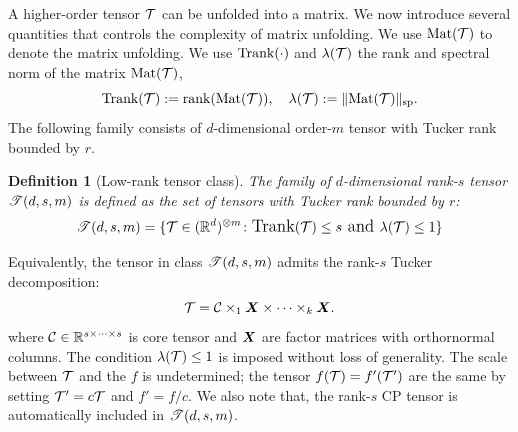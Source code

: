 \documentclass[final,12pt]{colt2020} %
\newtheorem{defn}{Definition}
\def\rank{\textup{Trank}}
\def\Mat{\textup{Mat}}
\def\caliT{\large\mathscr{T}}
\begin{document}

A higher-order tensor $\mathcal{T}$ can be unfolded into a matrix. We now introduce several quantities that controls the complexity of matrix unfolding. We use $\Mat(\tT)$ to denote the matrix unfolding. We use $\rank(\cdot)$ and $\lambda(\mathcal{T})$ the rank and spectral norm of the matrix $\Mat(\tT)$, 
\[
\rank(\tT):=\text{rank}(\Mat(\tT)), \quad  \lambda(\tT):=\snormSize{}{\Mat(\tT)}.
\]
The following family consists of $d$-dimensional order-$m$ tensor with Tucker rank bounded by $r$. 
\begin{defn}[Low-rank tensor class] The family of $d$-dimensional rank-$s$ tensor $\caliT(d,s,m)$ is defined as the set of tensors with Tucker rank bounded by $r$:
\[
\caliT(d,s,m)=\{\tT\in (\mathbb{R}^{d})^{\otimes m}\colon \rank(\tT)\leq s \text{ and } \lambda(\tT)\leq 1\}
\]
\end{defn}
Equivalently, the tensor in class $\caliT(d,s,m)$ admits the rank-$s$ Tucker decomposition:
\[
\mathcal{T}=\mathcal{C}\times_1\bm X\times\cdots\times_k \bm X.
\]
where $\mathcal{C}\in\mathbb{R}^{s\times \cdots \times s}$ is core tensor and $\bm X$ are factor matrices with orthornormal columns. The condition $\lambda(\mathcal{T})\leq 1$ is imposed without loss of generality. The scale between $\mathcal{T}$ and the $f$ is undetermined; the tensor $f(\mathcal{T})=f'(\mathcal{T}')$ are the same by setting $\mathcal{T}'=c\mathcal{T}$ and $f'=f/c$. 
We also note that, the rank-$s$ CP tensor is automatically included in $\caliT(d,s,m)$. 
\end{document}
